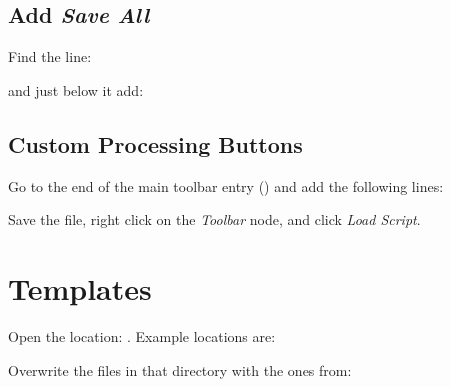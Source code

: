 \subsection{Add \textit{Save All}}
Find the line:
\begin{plainlist}
	\item {}
\end{plainlist}

and just below it add:
\begin{plainlist}
	\item {}
\end{plainlist}

\subsection{Custom Processing Buttons}

Go to the end of the main toolbar entry () and add the following lines:
\begin{plainlist}
	\item {}
	\item {}
	\item {}
	\item {}
	\item {}
\end{plainlist}
Save the file, right click on the \emph{Toolbar} node, and click \emph{Load Script}.

\section{Templates}
   \begin{numberedlist}
       \item Open the location: .  Example locations are:
       \begin{plainlist}
           \item {}
           \item {}
       \end{plainlist}
       \item Overwrite the files in that directory with the ones from:
       \begin{plainlist}
           \item {}
       \end{plainlist}
   \end{numberedlist}

